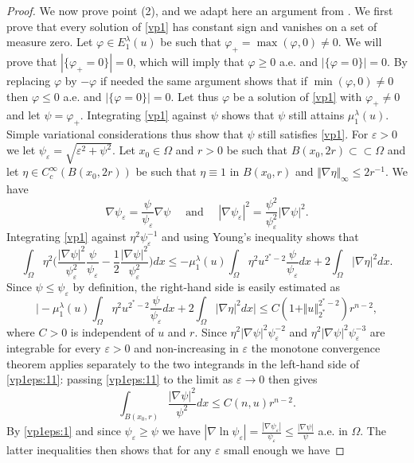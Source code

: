 \documentclass[10pt]{amsart}
\numberwithin{equation}{section}
\newcommand{\ve}{\varepsilon}
\newcommand{\vp}{\varphi}
\newcommand{\Om}{\Omega}
\newcommand{\ben}{\begin{equation}}
\newcommand{\een}{\end{equation}}
\theoremstyle{plain}
\theoremstyle{remark}
\begin{document}
\begin{proof}
We now prove point (2), and we adapt here an argument from \cite[Proposition 2.4]{GurskyPerez}. We first prove that every solution of \eqref{vp1} has constant sign and vanishes on a set of measure zero. Let $\vp \in E_1^{\lambda}(u)$ be such that $\vp_+ = \max(\vp, 0) \neq 0$. We will prove that $|\{\vp_+ = 0 \}| = 0$, which will imply that $\vp \ge 0$ a.e. and $|\{\vp = 0\}| = 0$. By replacing $\vp$ by $-\vp$ if needed the same argument shows that if $\min(\vp,0) \neq 0$ then $\vp \le 0$ a.e. and $|\{\vp = 0\}| = 0$.  Let thus $\vp$ be a solution of \eqref{vp1} with $\vp_+ \neq 0$ and let $\psi = \vp_+$. Integrating \eqref{vp1} against $\psi$ shows that $\psi$ still attains $\mu_1^{\lambda}(u)$. Simple variational considerations thus show that $\psi$ still satisfies \eqref{vp1}. For $\ve >0$ we let $\psi_\ve = \sqrt{\ve^2 + \psi^2}$. Let $x_0 \in \Om$ and $r>0$ be such that $B(x_0, 2r) \subset \subset \Om$ and let $\eta \in C^\infty_c(B(x_0,2r))$ be such that $\eta \equiv 1$ in $B(x_0,r)$ and $\Vert \nabla \eta \Vert_{\infty} \le 2 r^{-1}$. We have 
\begin{equation} \label{vp1eps:1}
 \nabla \psi_\ve =\frac{\psi}{\psi_\ve} \nabla \psi \quad \text{ and } \quad  |\nabla \psi_\ve|^2 = \frac{\psi^2}{\psi_\ve^2} |\nabla \psi|^2 .
 \end{equation}
Integrating \eqref{vp1} against $\eta^2 \psi_\ve^{-1}$ and using Young's inequality shows that 
\ben \label{vp1eps:11}
\int_{\Om} \eta^2 \Bigg( \frac{|\nabla \psi|^2}{\psi_\ve^2} \frac{\psi}{\psi_\ve} - \frac12 \frac{|\nabla \psi|^2}{\psi_\ve^2}\Bigg) dx \le -\mu_1^{\lambda}(u) \int_{\Om} \eta^2 u^{2^*-2} \frac{\psi}{\psi_\ve}dx + 2 \int_{\Om} |\nabla \eta|^2dx. 
\een
Since $\psi \le \psi_\ve$ by definition, the right-hand side is easily estimated as 
$$ \Big|  -\mu_1^{\lambda}(u) \int_{\Om} \eta^2 u^{2^*-2} \frac{\psi}{\psi_\ve}dx + 2 \int_{\Om} |\nabla \eta|^2dx  \Big| \le C(1+ \Vert u \Vert_{2^*}^{2^*-2}) r^{n-2},$$
where $C>0$ is independent of $u$ and $r$. Since $\eta^2 |\nabla \psi|^2 \psi_\ve^{-2}$ and  $\eta^2 |\nabla \psi|^2 \psi_\ve^{-3}$ are integrable for every $\ve >0$ and non-increasing in $\ve$ the monotone convergence theorem applies separately to the two integrands in the left-hand side of \eqref{vp1eps:11}: passing \eqref{vp1eps:11} to the limit as $\ve \to 0$ then gives
$$\int_{B(x_0,r)} \frac{|\nabla \psi|^2}{\psi^2} dx  \le C(n,u) r^{n-2}. $$
By  \eqref{vp1eps:1} and since $\psi_\ve \ge  \psi$ we have $ |\nabla \ln \psi_\ve| = \frac{|\nabla \psi_\ve|}{\psi_\ve} \le  \frac{|\nabla \psi|}{\psi}$
 a.e. in $\Omega$. The latter inequalities then shows that for any $\ve $ small enough we have

\end{proof}
\end{document}
